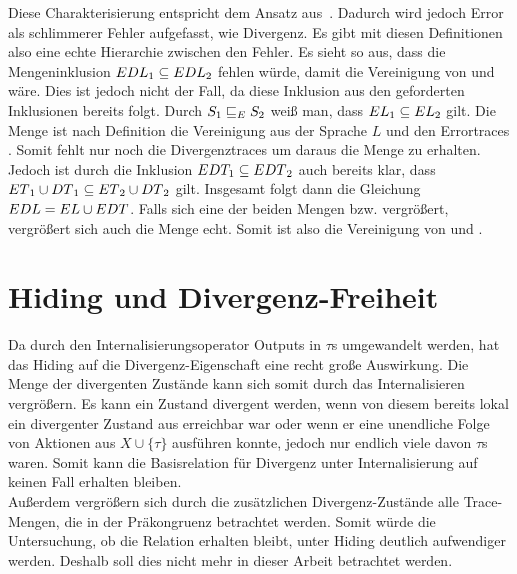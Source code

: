 Diese Charakterisierung \DaRel{} entspricht dem Ansatz
aus~\cite{Chilton2013}. Dadurch wird jedoch Error als \glqq{}schlimmerer
Fehler\grqq{} aufgefasst, wie Divergenz. Es gibt mit diesen Definitionen also
eine echte Hierarchie zwischen den Fehler. Es sieht so aus, dass die
Mengeninklusion $EDL{}_1\subseteq EDL{}_2$ fehlen würde, damit \DaRel{} die
Vereinigung von \ERel{} und \DRel{} wäre. Dies ist jedoch nicht der Fall, da
diese Inklusion aus den geforderten Inklusionen bereits folgt. Durch $S_1
\sqsubseteq _E{} S_2$ weiß man, dass $EL_1 \subseteq EL_2$ gilt. Die Menge \EL{} ist
nach Definition die Vereinigung aus der Sprache $L$ und den Errortraces \ET{}.
Somit fehlt nur noch die Divergenztraces \DT{} um daraus die Menge \EDL{} zu
erhalten. Jedoch ist durch die Inklusion $EDT_1\subseteq EDT{}_2$ auch
bereits klar, dass $ET{}_1\cup DT{}_1 \subseteq ET{}_2\cup DT{}_2$ gilt.
Insgesamt folgt dann die Gleichung $EDL = EL \cup EDT$. Falls sich eine
der beiden Mengen \EL{} bzw. \EDT{} vergrößert, vergrößert sich auch die Menge
\EDL{} echt. Somit ist also \DaRel{} die Vereinigung von \ERel{} und \DRel{}.

\section{Hiding und Divergenz-Freiheit}

Da durch den Internalisierungsoperator Outputs in $\tau$s umgewandelt werden,
hat das Hiding auf die Divergenz-Eigenschaft eine recht große Auswirkung. Die
Menge der divergenten Zustände kann sich somit durch das Internalisieren
vergrößern. Es kann ein Zustand divergent werden, wenn von diesem bereits
lokal ein divergenter Zustand aus erreichbar war oder wenn er eine unendliche
Folge von Aktionen aus $X\cup\{\tau\}$ ausführen konnte, jedoch nur endlich
viele davon $\tau$s waren. Somit kann die Basisrelation für Divergenz unter
Internalisierung auf keinen Fall erhalten bleiben.\\
Außerdem vergrößern sich durch die zusätzlichen Divergenz-Zustände alle
Trace-Mengen, die in der Präkongruenz \DRel{} betrachtet werden. Somit würde
die Untersuchung, ob die Relation erhalten bleibt, unter Hiding deutlich
aufwendiger werden. Deshalb soll dies nicht mehr in dieser Arbeit betrachtet
werden.
